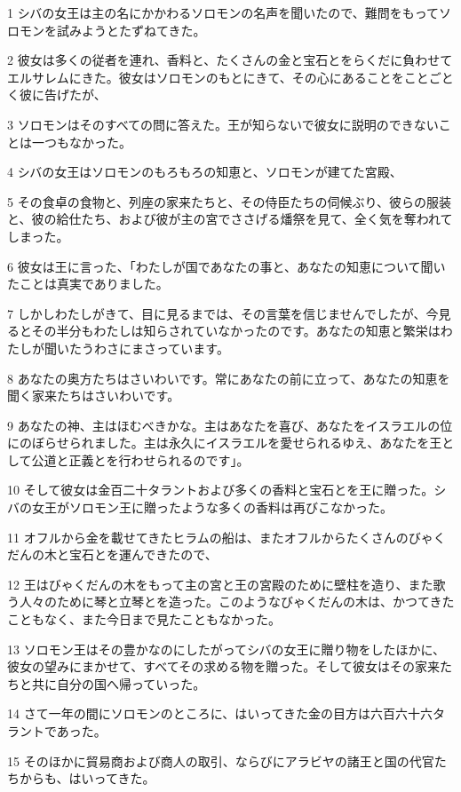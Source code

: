 \par 1 シバの女王は主の名にかかわるソロモンの名声を聞いたので、難問をもってソロモンを試みようとたずねてきた。
\par 2 彼女は多くの従者を連れ、香料と、たくさんの金と宝石とをらくだに負わせてエルサレムにきた。彼女はソロモンのもとにきて、その心にあることをことごとく彼に告げたが、
\par 3 ソロモンはそのすべての問に答えた。王が知らないで彼女に説明のできないことは一つもなかった。
\par 4 シバの女王はソロモンのもろもろの知恵と、ソロモンが建てた宮殿、
\par 5 その食卓の食物と、列座の家来たちと、その侍臣たちの伺候ぶり、彼らの服装と、彼の給仕たち、および彼が主の宮でささげる燔祭を見て、全く気を奪われてしまった。
\par 6 彼女は王に言った、「わたしが国であなたの事と、あなたの知恵について聞いたことは真実でありました。
\par 7 しかしわたしがきて、目に見るまでは、その言葉を信じませんでしたが、今見るとその半分もわたしは知らされていなかったのです。あなたの知恵と繁栄はわたしが聞いたうわさにまさっています。
\par 8 あなたの奥方たちはさいわいです。常にあなたの前に立って、あなたの知恵を聞く家来たちはさいわいです。
\par 9 あなたの神、主はほむべきかな。主はあなたを喜び、あなたをイスラエルの位にのぼらせられました。主は永久にイスラエルを愛せられるゆえ、あなたを王として公道と正義とを行わせられるのです」。
\par 10 そして彼女は金百二十タラントおよび多くの香料と宝石とを王に贈った。シバの女王がソロモン王に贈ったような多くの香料は再びこなかった。
\par 11 オフルから金を載せてきたヒラムの船は、またオフルからたくさんのびゃくだんの木と宝石とを運んできたので、
\par 12 王はびゃくだんの木をもって主の宮と王の宮殿のために壁柱を造り、また歌う人々のために琴と立琴とを造った。このようなびゃくだんの木は、かつてきたこともなく、また今日まで見たこともなかった。
\par 13 ソロモン王はその豊かなのにしたがってシバの女王に贈り物をしたほかに、彼女の望みにまかせて、すべてその求める物を贈った。そして彼女はその家来たちと共に自分の国へ帰っていった。
\par 14 さて一年の間にソロモンのところに、はいってきた金の目方は六百六十六タラントであった。
\par 15 そのほかに貿易商および商人の取引、ならびにアラビヤの諸王と国の代官たちからも、はいってきた。
